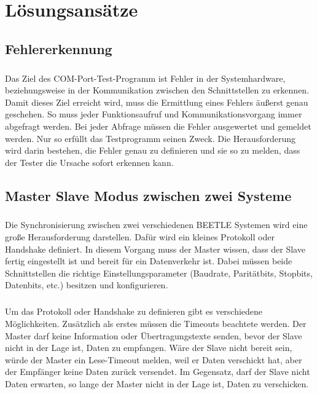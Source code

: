 \chapter{Lösungsansätze}\label{chp:loesungsansaetze}

\section{Fehlererkennung}
\paragraph{}
Das Ziel des COM-Port-Test-Programm ist Fehler in der Systemhardware, beziehungsweise in der Kommunikation zwischen den Schnittstellen zu erkennen. Damit dieses Ziel erreicht wird, muss die Ermittlung eines Fehlers äußerst genau geschehen. So muss jeder Funktionsaufruf und Kommunikationsvorgang immer abgefragt werden. Bei jeder Abfrage müssen die Fehler ausgewertet und gemeldet werden. Nur so erfüllt das Testprogramm seinen Zweck. Die Herausforderung wird darin bestehen, die Fehler genau zu definieren und sie so zu melden, dass der Tester die Ursache sofort erkennen kann.

\section{Master Slave Modus zwischen zwei Systeme}
\paragraph{}
Die Synchronisierung zwischen zwei verschiedenen BEETLE Systemen wird eine große Herausforderung darstellen. Dafür wird ein kleines Protokoll oder Handshake definiert. In diesem Vorgang muss der Master wissen, dass der Slave fertig eingestellt ist und bereit für ein Datenverkehr ist. Dabei müssen beide Schnittstellen die richtige Einstellungsparameter (Baudrate, Paritätbits, Stopbits, Datenbits, etc.) besitzen und konfigurieren.

\paragraph{}
Um das Protokoll oder Handshake zu definieren gibt es verschiedene Möglichkeiten. Zusätzlich als erstes müssen die Timeouts beachtete werden. Der Master darf keine Information oder Übertragungstexte senden, bevor der Slave nicht in der Lage ist, Daten zu empfangen. Wäre der Slave nicht bereit sein, würde der Master ein Lese-Timeout melden, weil er Daten verschickt hat, aber der Empfänger keine Daten zurück versendet. Im Gegensatz, darf der Slave nicht Daten erwarten, so lange der Master nicht in der Lage ist, Daten zu verschicken.\\


